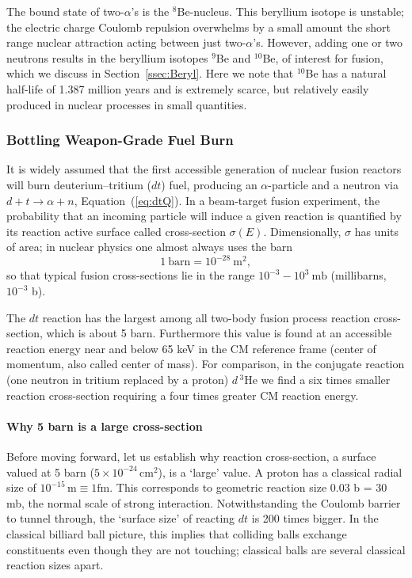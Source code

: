 \documentclass[particles,article,accept,pdftex,moreauthors]{Definitions/mdpi}
\newcommand{\req}[1]{Equation~(\ref{#1})}
\newcommand{\rsec}[1]{Section~\ref{#1}}
\begin{document}
The bound state of two-$\alpha$'s is the ${}^8$Be-nucleus. This beryllium isotope is unstable; the electric charge Coulomb repulsion overwhelms by a small amount the short range nuclear attraction acting between just two-$\alpha$'s. However, adding one or two neutrons results in the beryllium isotopes ${}^9$Be and ${}^{10}$Be, of interest for fusion, which we discuss in \rsec{ssec:Beryl}. Here we note that ${}^{10}$Be has a natural half-life of 1.387 million years and is extremely scarce, but relatively easily produced in nuclear processes in small quantities.

\subsubsection{Bottling Weapon-Grade Fuel Burn}\label{sssec:bottleHBomb}
It is widely assumed that the first accessible generation of nuclear fusion reactors will burn deuterium--tritium ($dt$) fuel, producing an $\alpha$-particle and a neutron via $d+t\to \alpha +n$, \req{eq:dtQ}. In a beam-target fusion experiment, the probability that an incoming particle will induce a given reaction is quantified by its reaction active surface called cross-section $\sigma(E)$. Dimensionally, $\sigma$ has units of area; in nuclear physics one almost always uses the barn
\[
1\ \mathrm{barn} = 10^{-28}\ \mathrm{m}^2,
\]
so that typical fusion cross-sections lie in the range $10^{-3}-10^3\ \mathrm{mb}$ (millibarns, $10^{-3}$ b).

The $dt$ reaction has the largest among all two-body fusion process reaction cross-section, which is about 5 barn. Furthermore this value is found at an accessible reaction energy near and below 65 keV in the CM reference frame (center of momentum, also called center of mass). For comparison, in the conjugate reaction (one neutron in tritium replaced by a proton) $d\,{}^{3}\mathrm{He}$ we find a six times smaller reaction cross-section requiring a four times greater CM reaction energy.

\paragraph*{\bf Why 5 barn is a large cross-section}
Before moving forward, let us establish why reaction cross-section, a surface valued at 5 barn ($5\times 10^{-24}\,\mathrm{cm}^2$), is a `large' value. A proton has a classical radial size of $10^{-15}\,\mathrm{m}\equiv 1\mathrm{fm}$. This corresponds to geometric reaction size 0.03 b = 30 mb, the normal scale of strong interaction. Notwithstanding the Coulomb barrier to tunnel through, the `surface size' of reacting $dt$ is 200 times bigger. In the classical billiard ball picture, this implies that colliding balls exchange constituents even though they are not touching; classical balls are several classical reaction sizes apart. 
\end{document}
